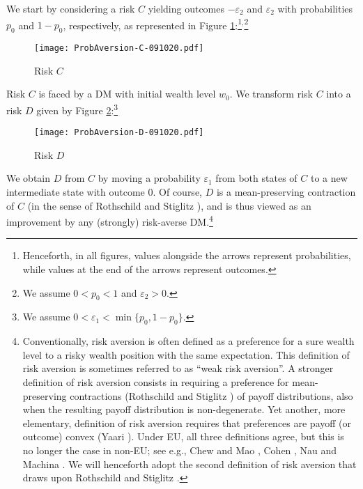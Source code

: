 \documentclass[11pt]{article}
\begin{document}
We start by considering a risk $C$
yielding outcomes $-\varepsilon_{2}$ and $\varepsilon_{2}$ with probabilities $p_{0}$ and $1-p_{0}$, respectively,
as represented in Figure \ref{fig:C}:\footnote{Henceforth, in all figures,
values alongside the arrows represent probabilities,
while values at the end of the arrows represent outcomes.}$^{,}$\footnote{We assume $0<p_{0}<1$ and $\varepsilon_{2}>0$.}
\vskip -0.5cm
\begin{figure}[H]
\begin{center}
\caption{Risk $C$
}
\vskip 0.4cm
\texttt{[image: ProbAversion-C-091020.pdf]}
\label{fig:C}
\end{center}
\end{figure}
\noindent Risk $C$ is faced by a DM with initial wealth level $w_{0}$.
We transform risk $C$ into a risk $D$ given by Figure \ref{fig:D}:\footnote{We assume $0<\varepsilon_{1}<\min\{p_{0},1-p_{0}\}$.}
\vskip -0.5cm
\begin{figure}[H]
\begin{center}
\caption{Risk $D$
}
\vskip 0.4cm
\texttt{[image: ProbAversion-D-091020.pdf]}
\label{fig:D}
\end{center}
\end{figure}
\noindent We obtain $D$ from $C$ by moving a probability $\varepsilon_{1}$
from both states of $C$ to a new intermediate state with outcome $0$.
Of course, $D$ is a mean-preserving contraction of $C$ (in the sense of Rothschild and Stiglitz \cite{RS70}),
and is thus viewed as an improvement by any (strongly) risk-averse DM.\footnote{Conventionally, risk aversion is often defined as
a preference for a sure wealth level
to a risky wealth position with the same expectation.
This definition of risk aversion is sometimes referred to as ``weak risk aversion''.
A stronger definition of risk aversion consists in requiring a preference for mean-preserving contractions
(Rothschild and Stiglitz \cite{RS70}) of payoff distributions,
also when the resulting payoff distribution is non-degenerate.
Yet another, more elementary, definition of risk aversion
requires that preferences are payoff (or outcome) convex (Yaari \cite{Y69}).
Under EU, all three definitions agree, but this is no longer the case in non-EU;
see e.g., Chew and Mao \cite{CM95}, Cohen \cite{C95}, Nau \cite{N03} and Machina \cite{M13}.
We will henceforth adopt the second definition of risk aversion that draws upon Rothschild and Stiglitz \cite{RS70}.}
\end{document}
